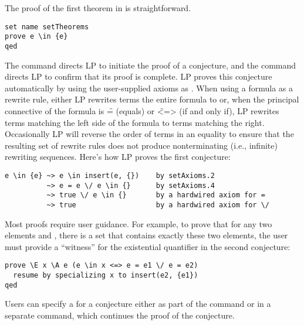 
The proof of the first theorem in  is straightforward.
\begin{verbatim}
set name setTheorems
prove e \in {e}
qed
\end{verbatim}

The  command directs LP to initiate the proof of a conjecture, and
the  command directs LP to confirm that its proof is complete.  LP
proves this conjecture automatically by using the user-supplied axioms as
.  When using a formula as a rewrite rule,
either LP rewrites terms  the entire formula to
 or, when the principal connective of the formula is  \f{=} (equals) 
or \f{<=>} (if and only if), LP rewrites terms matching the left side of the
formula to terms matching the right.  Occasionally LP will reverse the order of
terms in an equality to ensure that the resulting set of rewrite rules does not
produce nonterminating (i.e., infinite) rewriting sequences.  Here's how LP
proves the first conjecture:
\begin{verbatim}
e \in {e} ~> e \in insert(e, {})    by setAxioms.2
          ~> e = e \/ e \in {}      by setAxioms.4
          ~> true \/ e \in {}       by a hardwired axiom for =
          ~> true                   by a hardwired axiom for \/
\end{verbatim}

Most proofs require user guidance.  For example, to prove that for any two
elements  and , there is a set that contains exactly these two
elements, the user must provide a ``witness'' for the existential quantifier in
the second conjecture:

\begin{verbatim}
prove \E x \A e (e \in x <=> e = e1 \/ e = e2)
  resume by specializing x to insert(e2, {e1})
qed
\end{verbatim}
Users can specify a  for a conjecture either as
part of the  command or in a separate  command,
which continues the proof of the conjecture.

